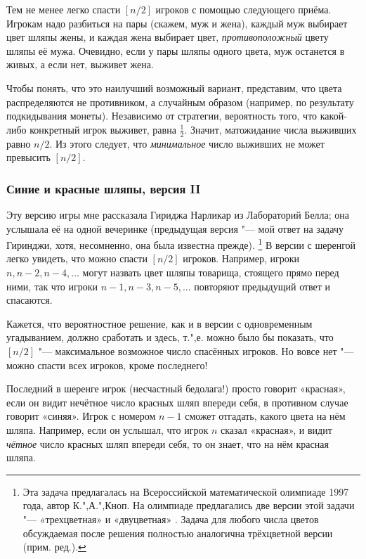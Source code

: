 \documentclass[twoside]{book}
\begin{document}
\medskip

Тем не менее легко спасти $[n/2]$ игроков с помощью следующего приёма.
Игрокам надо разбиться на пары (скажем, муж и жена), каждый муж выбирает цвет шляпы жены, и каждая жена выбирает цвет, \emph{противоположный} цвету шляпы её мужа.
Очевидно, если у пары шляпы одного цвета, муж останется в живых, а если нет, выживет жена.

Чтобы понять, что это наилучший возможный вариант, представим, что цвета распределяются не противником, а случайным образом 
(например, по результату подкидывания монеты).
Независимо от стратегии, вероятность того, что какой-либо конкретный игрок выживет, равна $\tfrac12$.
Значит, матожидание числа выживших равно $n/2$. 
Из этого следует, что \emph{минимальное} число выживших не может превысить $[n/2]$.\heart

\subsubsection*{Синие и красные шляпы, версия II}%

Эту версию игры мне рассказала Гириджа Нарликар из Лабораторий Белла; %
она услышала её на одной вечеринке (предыдущая версия "--- мой ответ на задачу Гиринджи, хотя, несомненно, она была известна прежде).%
\footnote{Эта задача предлагалась на Всероссийской математической олимпиаде 1997 года, автор  К.",А.",Кноп. 
На олимпиаде предлагались две версии этой задачи "--- «трехцветная» и «двуцветная» \cite[№ 524 и № 538]{ВсеРос2007}. 
Задача для любого числа цветов обсуждаемая после решения полностью аналогична трёхцветной версии (прим. ред.).}
В версии с шеренгой легко увидеть, что можно спасти $[n/2]$ игроков.
Например, игроки $n, n-2, n-4,\dots$
могут назвать цвет шляпы товарища, стоящего прямо перед ними, так что игроки $n-1, n-3,n-5,\dots$
повторяют предыдущий ответ и спасаются.

\medskip

Кажется, что вероятностное решение, как и в версии с одновременным угадыванием, должно сработать и здесь, т.",е. можно было бы показать, что $[n/2]$ "--- максимальное возможное число спасённых игроков.  
Но вовсе нет "--- можно спасти всех игроков, кроме последнего!

Последний в шеренге игрок (несчастный бедолага!) просто говорит
«красная», если он видит нечётное число красных шляп впереди себя, в противном случае говорит «синяя».
Игрок с номером $n-1$ сможет отгадать, какого цвета на нём шляпа.
Например, если он услышал, что игрок $n$ сказал
«красная», и видит \emph{чётное} число красных шляп впереди себя, то он знает, что на нём красная шляпа.
\end{document}
